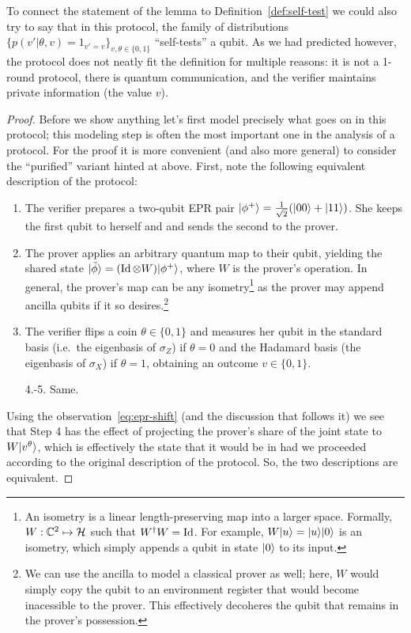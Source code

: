 To connect the statement of the lemma to Definition~\ref{def:self-test} we could also try to say that in this protocol, the family of distributions $\{p(v'|\theta,v)=1_{v'=v}\}_{v,\theta\in\{0,1\}}$ ``self-tests'' a qubit. As we had predicted however, the protocol does not neatly fit the definition for multiple reasons: it is not a 1-round protocol, there is quantum communication, and the verifier maintains private information (the value $v$). 

\begin{proof}
Before we show anything let's first model precisely what goes on in this protocol; this modeling step is often the most important one in the analysis of a protocol. For the proof it is more convenient (and also more general) to consider the ``purified'' variant hinted at above. First, note the following equivalent description of the protocol:
\begin{enumerate}
\item The verifier prepares a two-qubit EPR pair $|\phi^+\rangle = \frac{1}{\sqrt{2}}(|00\rangle + |11\rangle)$. She keeps the first qubit to herself and and sends the second to the prover. 
\item The prover applies an arbitrary quantum map to their qubit, yielding the shared state $|\tilde{\phi}\rangle = (\mathop{\rm Id}\nolimits\otimes W)|\phi^+\rangle$, where $W$ is the prover's operation. In general, the prover's map can be any isometry\footnote{An isometry is a linear length-preserving map into a larger space. Formally, $W:\mathbb{C}^2\mapsto \mathcal{H}$ such that $W^\dagger W = \mathop{\rm Id}\nolimits$. For example, $W|u\rangle = |u\rangle|0\rangle$ is an isometry, which simply appends a qubit in state $|0\rangle$ to its input.} as the prover may append ancilla qubits if it so desires.\footnote{We can use the ancilla to model a classical prover as well; here, $W$ would simply copy the qubit to an environment register that would become inacessible to the prover. This effectively decoheres the qubit that remains in the prover's possession.} 
\item The verifier  flips a coin $\theta\in\{0,1\}$ and measures her qubit in the standard basis (i.e.\ the eigenbasis of $\sigma_Z$) if $\theta=0$ and the Hadamard basis (the eigenbasis of $\sigma_X$) if $\theta=1$, obtaining an outcome $v\in\{0,1\}$.
\item[4.-5.] Same.
\end{enumerate}
Using the observation~\eqref{eq:epr-shift} (and the discussion that follows it) we see that Step 4 has the effect of projecting the prover's share of the joint state to $W |v^\theta\rangle$, which is effectively the state that it would be in had we proceeded according to the original description of the protocol. So, the two descriptions are equivalent.


\end{proof}
